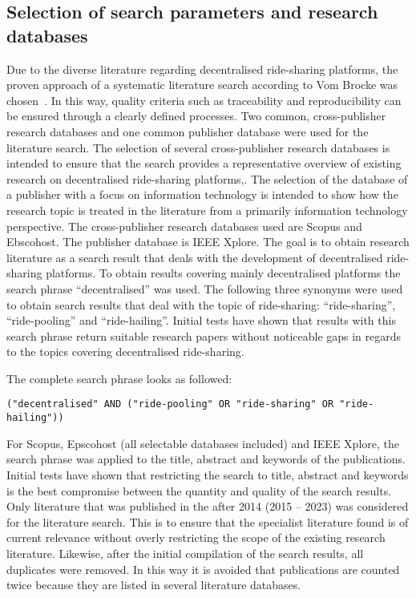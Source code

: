 \subsection{Selection of search parameters and research databases}
Due to the diverse literature regarding decentralised ride-sharing platforms, the proven approach of a systematic literature search according to Vom Brocke was chosen~\cite{inproceedings}. In this way, quality criteria such as traceability and reproducibility can be ensured through a clearly defined processes. Two common, cross-publisher research databases and one common publisher database were used for the literature search.
The selection of several cross-publisher research databases is intended to ensure that the search provides a representative overview of existing research on decentralised ride-sharing platforms,. The selection of the database of a publisher with a focus on information technology is intended to show how the research topic is treated in the literature from a primarily information technology perspective. The cross-publisher research databases used are Scopus and Ebscohost. The publisher database is IEEE Xplore.
The goal is to obtain research literature as a search result that deals with the development of decentralised ride-sharing platforms. To obtain results covering mainly decentralised platforms the search phrase ``decentralised'' was used. The following three synonyms were used to obtain search results that deal with the topic of ride-sharing: ``ride-sharing'', ``ride-pooling'' and ``ride-hailing''. Initial tests have shown that results with this search phrase return suitable research papers without noticeable gaps in regards to the topics covering decentralised ride-sharing.

The complete search phrase looks as followed:
\begin{verbatim}
("decentralised" AND ("ride-pooling" OR "ride-sharing" OR "ride-hailing"))
\end{verbatim}

For Scopus, Epscohost (all selectable databases included) and IEEE Xplore, the search phrase was applied to the title, abstract and keywords of the publications. Initial tests have shown that restricting the search to title, abstract and keywords is the best compromise between the quantity and quality of the search results. Only literature that was published in the after 2014 (2015 – 2023) was considered for the literature search. This is to ensure that the specialist literature found is of current relevance without overly restricting the scope of the existing research literature. Likewise, after the initial compilation of the search results, all duplicates were removed. In this way it is avoided that publications are counted twice because they are listed in several literature databases.

